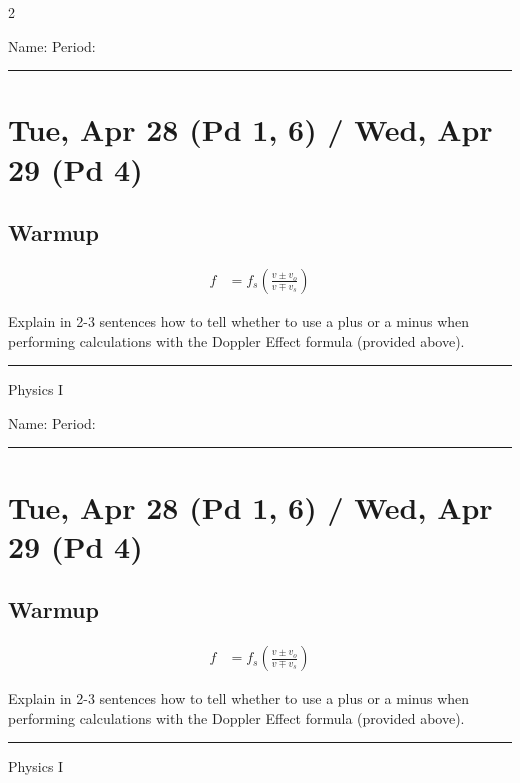 \documentclass[10pt,landscape]{exam}
\def\todayDate{Tue, Apr 28 (Pd 1, 6) / Wed, Apr 29 (Pd 4)}
\def\content{
\begin{align*}
  f &= f_s \left( \frac{v\pm v_o}{v\mp v_s} \right) 
\end{align*}

\noindent
Explain in 2-3 sentences how to tell whether to use a plus or a minus when performing calculations with the Doppler Effect formula (provided above).
}
\begin{document}
\pagestyle{empty}

\setlength{\columnsep}{0.8in}
\begin{multicols*}{2}

\noindent  
Name: \hfill Period: \hspace{5em}
\vspace{0.5em}
\hrule

\section*{\todayDate}
\subsection*{Warmup}

\content

\vfill
\hrule
\vspace{0.5em}
\hfill {\sc Physics I}

\columnbreak

\noindent  
Name: \hfill Period: \hspace{5em}
\vspace{0.5em}
\hrule

\section*{\todayDate}
\subsection*{Warmup}

\content

\vfill
\hrule
\vspace{0.5em}
\hfill {\sc Physics I}

\end{multicols*}
\end{document}
